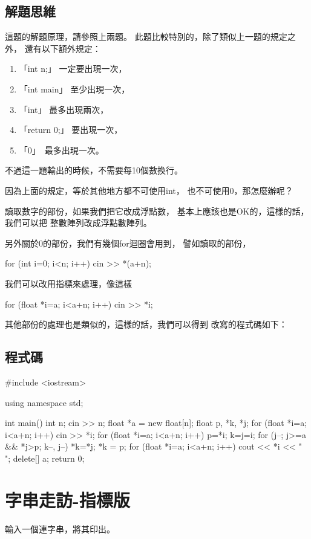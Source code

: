 \subsection{解題思維}
這題的解題原理，請參照上兩題。
此題比較特別的，除了類似上一題的規定之外，
還有以下額外規定：
\begin{enumerate}
	\item 「int n;」 一定要出現一次，
	\item 「int main」 至少出現一次，
	\item 「int」 最多出現兩次，
	\item 「return 0;」 要出現一次，
	\item 「0」　最多出現一次。
\end{enumerate}
不過這一題輸出的時候，不需要每10個數換行。

因為上面的規定，等於其他地方都不可使用int，
也不可使用0，那怎麼辦呢？

讀取數字的部份，如果我們把它改成浮點數，
基本上應該也是OK的，這樣的話，我們可以把
整數陣列改成浮點數陣列。

另外關於0的部份，我們有幾個for迴圈會用到，
譬如讀取的部份，
\begin{inside}
	for (int i=0; i<n; i++) cin >> *(a+n);
\end{inside}

我們可以改用指標來處理，像這樣
\begin{inside}
	for (float *i=a; i<a+n; i++) cin >> *i;
\end{inside}

其他部份的處理也是類似的，這樣的話，我們可以得到
改寫的程式碼如下：
	
\subsection{程式碼}
\begin{cppcode}

#include <iostream>

using namespace std;

int main()
{
	int n; 
	cin >> n;
	float *a = new float[n];
	float p, *k, *j;
	for (float *i=a; i<a+n; i++) cin >> *i;
	for (float *i=a; i<a+n; i++) {
		p=*i;
		k=j=i;
		for (j--; j>=a && *j>p; k--, j--) *k=*j;
		*k = p;
	}
	for (float *i=a; i<a+n; i++) cout << *i << " ";
	delete[] a;
	return 0;
}
\end{cppcode}

\section{字串走訪-指標版}
輸入一個連字串，將其印出。

